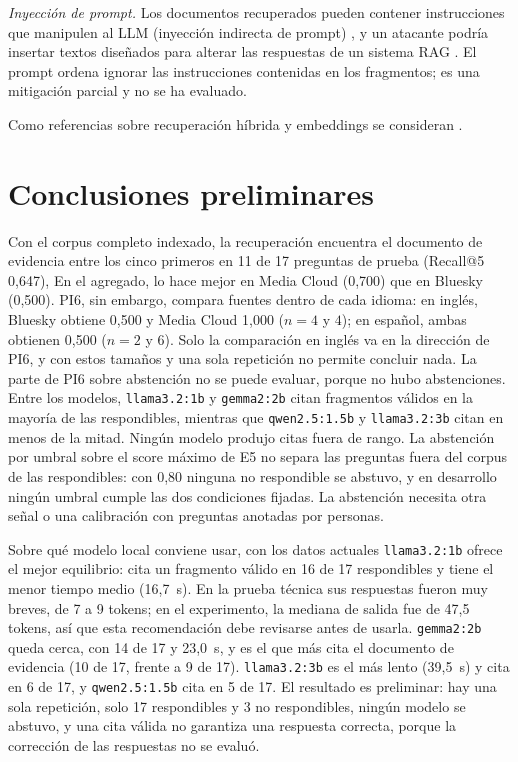\documentclass[conference]{IEEEtran}
\begin{document}
\textit{Inyección de prompt.} Los documentos recuperados pueden contener instrucciones que manipulen al LLM (inyección indirecta de prompt) \cite{greshake2023}, y un atacante podría insertar textos diseñados para alterar las respuestas de un sistema RAG \cite{zou2024}. El prompt ordena ignorar las instrucciones contenidas en los fragmentos; es una mitigación parcial y no se ha evaluado.

Como referencias sobre recuperación híbrida y embeddings se consideran \cite{robertson2009,cormack2009,karpukhin2020,formal2021,chen2024bge,muennighoff2022mteb}.

\section{Conclusiones preliminares}
Con el corpus completo indexado, la recuperación encuentra el documento de evidencia entre los cinco primeros en 11 de 17 preguntas de prueba (Recall@5 0,647), En el agregado, lo hace mejor en Media Cloud (0,700) que en Bluesky (0,500). PI6, sin embargo, compara fuentes dentro de cada idioma: en inglés, Bluesky obtiene 0,500 y Media Cloud 1,000 ($n=4$ y $4$); en español, ambas obtienen 0,500 ($n=2$ y $6$). Solo la comparación en inglés va en la dirección de PI6, y con estos tamaños y una sola repetición no permite concluir nada. La parte de PI6 sobre abstención no se puede evaluar, porque no hubo abstenciones. Entre los modelos, \texttt{llama3.2:1b} y \texttt{gemma2:2b} citan fragmentos válidos en la mayoría de las respondibles, mientras que \texttt{qwen2.5:1.5b} y \texttt{llama3.2:3b} citan en menos de la mitad. Ningún modelo produjo citas fuera de rango. La abstención por umbral sobre el score máximo de E5 no separa las preguntas fuera del corpus de las respondibles: con 0,80 ninguna no respondible se abstuvo, y en desarrollo ningún umbral cumple las dos condiciones fijadas. La abstención necesita otra señal o una calibración con preguntas anotadas por personas.

Sobre qué modelo local conviene usar, con los datos actuales \texttt{llama3.2:1b} ofrece el mejor equilibrio: cita un fragmento válido en 16 de 17 respondibles y tiene el menor tiempo medio (16,7~s). En la prueba técnica sus respuestas fueron muy breves, de 7 a 9 tokens; en el experimento, la mediana de salida fue de 47,5 tokens, así que esta recomendación debe revisarse antes de usarla. \texttt{gemma2:2b} queda cerca, con 14 de 17 y 23,0~s, y es el que más cita el documento de evidencia (10 de 17, frente a 9 de 17). \texttt{llama3.2:3b} es el más lento (39,5~s) y cita en 6 de 17, y \texttt{qwen2.5:1.5b} cita en 5 de 17. El resultado es preliminar: hay una sola repetición, solo 17 respondibles y 3 no respondibles, ningún modelo se abstuvo, y una cita válida no garantiza una respuesta correcta, porque la corrección de las respuestas no se evaluó.
\end{document}
